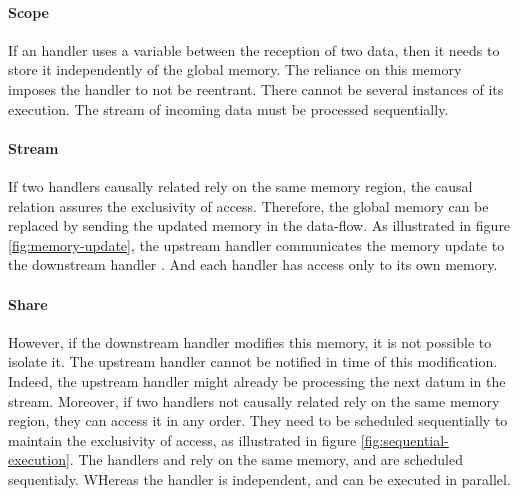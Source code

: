 

\paragraph{Scope}
If an handler uses a variable between the reception of two data, then it needs to store it independently of the global memory.
The reliance on this memory imposes the handler to not be reentrant.
There cannot be several instances of its execution.
The stream of incoming data must be processed sequentially.


\paragraph{Stream}
If two handlers causally related rely on the same memory region, the causal relation assures the exclusivity of access. Therefore, the global memory can be replaced by sending the updated memory in the data-flow.
As illustrated in figure \ref{fig:memory-update}, the upstream handler  communicates the memory update to the downstream handler .
And each handler has access only to its own memory.

\paragraph{Share}
However, if the downstream handler modifies this memory, it is not possible to isolate it.
The upstream handler cannot be notified in time of this modification.
Indeed, the upstream handler might already be processing the next datum in the stream.
Moreover, if two handlers not causally related rely on the same memory region, they can access it in any order.
They need to be scheduled sequentially to maintain the exclusivity of access, as illustrated in figure \ref{fig:sequential-execution}.
The handlers  and  rely on the same memory, and are scheduled sequentialy.
WHereas the handler  is independent, and can be executed in parallel.

